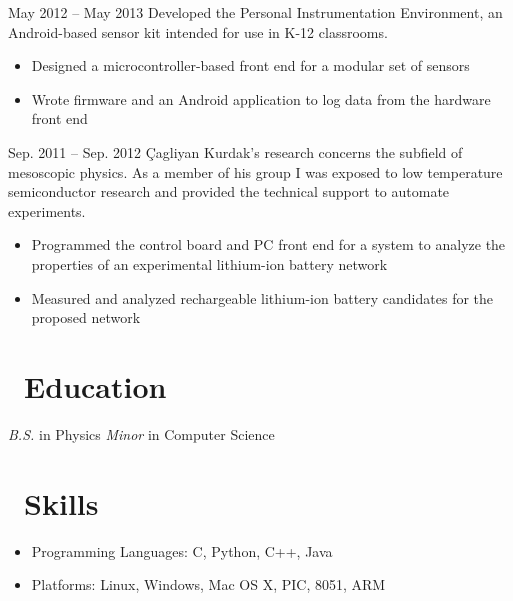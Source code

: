 \documentclass{resume}
\begin{document}
          {May 2012 -- May 2013}
Developed the Personal Instrumentation Environment, an Android-based sensor
kit intended for use in K-12 classrooms.
\begin{itemize}
  \item Designed a microcontroller-based front end for a modular set of sensors
  \item Wrote firmware and an Android application to log data from the hardware
      front end
\end{itemize}
\vspace{3mm}

          {Sep. 2011 -- Sep. 2012}
Çagliyan Kurdak's research concerns the subfield of mesoscopic physics. As a
member of his group I was exposed to low temperature semiconductor research and
provided the technical support to automate experiments.
\begin{itemize}
  \item Programmed the control board and PC front end for a system to analyze the
      properties of an experimental lithium-ion battery network
  \item Measured and analyzed rechargeable lithium-ion battery candidates for the
      proposed network
\end{itemize}

\section{\faGraduationCap\ Education}
\textit{B.S.} in Physics
\newline
\textit{Minor} in Computer Science

\section{\faCogs\ Skills}
\begin{itemize}[parsep=0.5ex]
  \item Programming Languages: C, Python, C++, Java
  \item Platforms: Linux, Windows, Mac OS X, PIC, 8051, ARM
\end{itemize}
\end{document}
